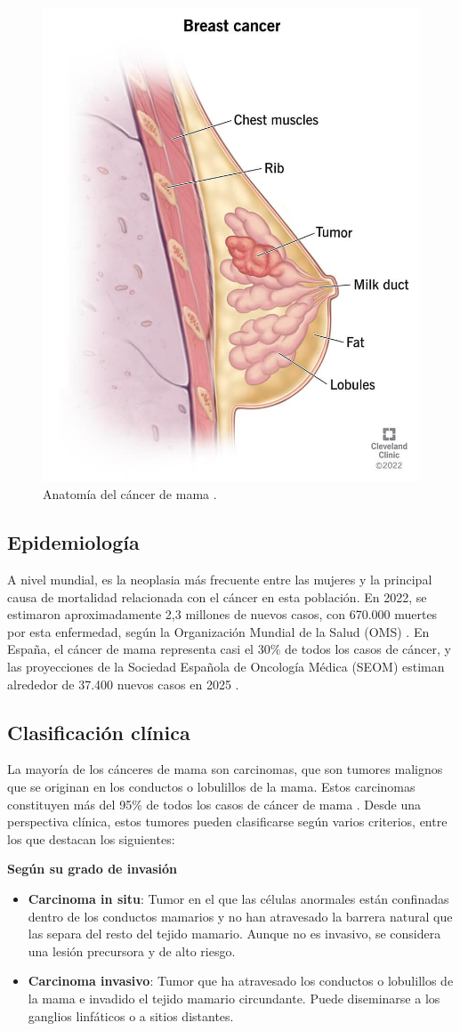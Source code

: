 \documentclass[a4paper,10pt]{book}
\begin{document}
\begin{figure}[h]
	\centering
	\includegraphics[width=0.3\linewidth]{reports//assets/bc.jpg}
	\caption[Anatomía del cáncer de mama]{Anatomía del cáncer de mama \cite{cleveland_clinic_breast_2023}.}
	\label{fig:breast-cancer-anatomy}
\end{figure}

\subsection{Epidemiología}

A nivel mundial, es la neoplasia más frecuente entre las mujeres y la principal causa de mortalidad relacionada con el cáncer en esta población. En 2022, se estimaron aproximadamente 2,3 millones de nuevos casos, con 670.000 muertes por esta enfermedad, según la Organización Mundial de la Salud (OMS) \cite{who_breast_2024}. En España, el cáncer de mama representa casi el 30\% de todos los casos de cáncer, y las proyecciones de la Sociedad Española de Oncología Médica (SEOM) estiman alrededor de 37.400 nuevos casos en 2025 \cite{seom_cancer_nodate}.

\subsection{Clasificación clínica}

La mayoría de los cánceres de mama son carcinomas, que son tumores malignos que se originan en los conductos o lobulillos de la mama. Estos carcinomas constituyen más del 95\% de todos los casos de cáncer de mama \cite{makki_diversity_2015, noauthor_types_nodate}. Desde una perspectiva clínica, estos tumores pueden clasificarse según varios criterios, entre los que destacan los siguientes:

\textbf{Según su grado de invasión}
\begin{itemize}
\item \textbf{Carcinoma in situ}: Tumor en el que las células anormales están confinadas dentro de los conductos mamarios y no han atravesado la barrera natural que las separa del resto del tejido mamario. Aunque no es invasivo, se considera una lesión precursora y de alto riesgo.
\item \textbf{Carcinoma invasivo}: Tumor que ha atravesado los conductos o lobulillos de la mama e invadido el tejido mamario circundante. Puede diseminarse a los ganglios linfáticos o a sitios distantes.
\end{itemize}
\end{document}
